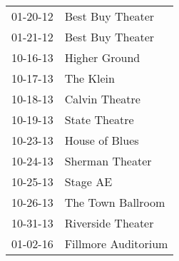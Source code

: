 \begin{supertabular}{p{0.25\columnwidth}p{0.75\columnwidth}}
 01-20-12 &     Best Buy Theater \\
 01-21-12 &     Best Buy Theater \\
 10-16-13 &        Higher Ground \\
 10-17-13 &            The Klein \\
 10-18-13 &       Calvin Theatre \\
 10-19-13 &        State Theatre \\
 10-23-13 &       House of Blues \\
 10-24-13 &      Sherman Theater \\
 10-25-13 &             Stage AE \\
 10-26-13 &    The Town Ballroom \\
 10-31-13 &    Riverside Theater \\
 01-02-16 &  Fillmore Auditorium \\
\end{supertabular}
